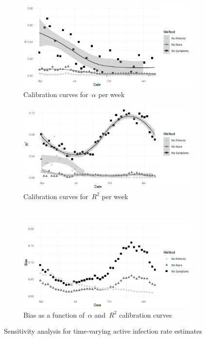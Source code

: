 \documentclass[11pt]{amsart}
\numberwithin{equation}{section}
\theoremstyle{plain}
\begin{document}
\begin{figure}[!th]
 \centering
 \begin{subfigure}{.5\textwidth}
  \centering
  \includegraphics[width=.9\linewidth]{../figs/alpha_sensitivity_fig.png}
  \caption{Calibration curves for~$\alpha$ per week}
  \label{fig:alpha_sensitivity}
 \end{subfigure}
 \begin{subfigure}{.45\textwidth}
  \centering
  \includegraphics[width=.9\linewidth]{../figs/rsq_sensitivity_fig.png}
 \caption{Calibration curves for~$R^2$ per week}
 \label{fig:rsq_sensitivity}
 \end{subfigure} \\ [1ex]
 \begin{subfigure}{\linewidth}
 \centering
 \includegraphics[width=.5\linewidth]{../figs/bias_sensitivity_fig.png}
  \caption{Bias as a function of~$\alpha$ and~$R^2$ calibration curves}
  \label{fig:bias_sensitivity}
 \end{subfigure}
 \caption{Sensitivity analysis for time-varying active infection rate estimates}
 \label{fig:sensitivity}
 \end{figure}






\end{document}
